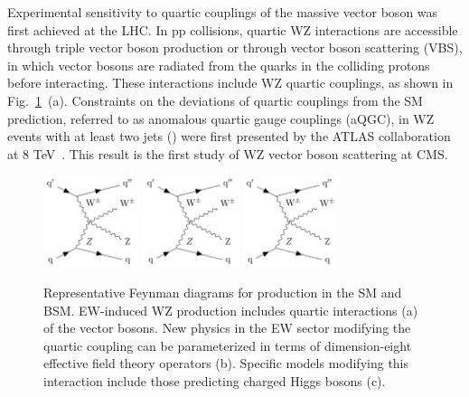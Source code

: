 Experimental sensitivity to quartic couplings of the massive vector boson 
was first achieved at the LHC.
In pp collisions, quartic WZ interactions are accessible through triple 
vector boson production or through vector boson scattering (VBS), 
in which vector bosons are radiated from the quarks in the colliding protons 
before interacting.
These interactions include WZ quartic couplings, as shown in Fig.~\ref{fig:feynmanDiagrams}~(a). 
Constraints on the deviations of quartic couplings from the SM prediction, 
referred to as anomalous quartic gauge couplings (aQGC), in 
WZ events with at least two jets (\WZjj) were first
presented by the ATLAS collaboration at 8 TeV~\cite{Aad:2016ett}. This result
is the first study of WZ vector boson scattering at CMS. 

\begin{figure}[htbp]
  \centering
   \includegraphics[page=1,width=0.25\textwidth]{figures/FeynmanDiagrams/feynmanVBS.pdf}
   \includegraphics[page=2,width=0.25\textwidth]{figures/FeynmanDiagrams/feynmanVBS.pdf}
   \includegraphics[page=3,width=0.25\textwidth]{figures/FeynmanDiagrams/feynmanVBS.pdf}
  \caption{Representative Feynman diagrams for \WZjj production in the SM and BSM. 
  EW-induced WZ production includes quartic interactions (a) of the vector bosons.
  New physics in the EW sector modifying the quartic coupling 
  can be parameterized in terms of dimension-eight effective field theory operators (b).
  Specific models modifying this interaction include those predicting charged Higgs bosons (c).
  }
 \label{fig:feynmanDiagrams}
\end{figure}

